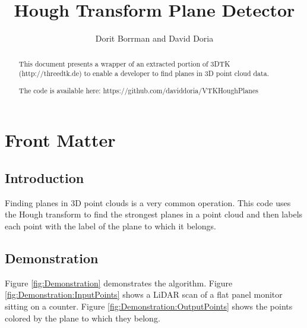 \documentclass{InsightArticle}
\title{Hough Transform Plane Detector}
\author{Dorit Borrman and David Doria}
\newcommand{\IJhandlerIDnumber}{3250}
\begin{document}
\IJhandlefooter{\IJhandlerIDnumber}


\ifpdf
\else
\fi


\maketitle


\ifhtml
\chapter*{Front Matter\label{front}}
\fi

\begin{abstract}
\noindent
This document presents a wrapper of an extracted portion of 3DTK (http://threedtk.de) to enable a developer to find planes in 3D point cloud data.

The code is available here:
https://github.com/daviddoria/VTKHoughPlanes

\end{abstract}

\IJhandlenote{\IJhandlerIDnumber}

\tableofcontents
\section{Introduction}
Finding planes in 3D point clouds is a very common operation. This code uses the Hough transform to find the strongest planes in a point cloud and then labels each point with the label of the plane to which it belongs.

\section{Demonstration}
Figure \ref{fig:Demonstration} demonstrates the algorithm. Figure \ref{fig:Demonstration:InputPoints} shows a LiDAR scan of a flat panel monitor sitting on a counter. Figure \ref{fig:Demonstration:OutputPoints} shows the points colored by the plane to which they belong.
\end{document}
